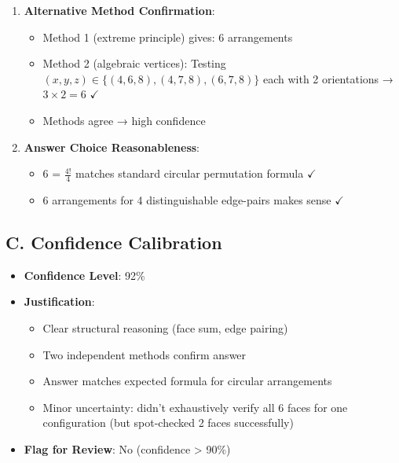 \documentclass[]{article}
\begin{document}
\begin{verificationbox}
\begin{enumerate}[leftmargin=*]
    \item \textbf{Alternative Method Confirmation}:
    \begin{itemize}
        \item Method 1 (extreme principle) gives: 6 arrangements
        \item Method 2 (algebraic vertices): Testing $(x,y,z) \in \{(4,6,8), (4,7,8), (6,7,8)\}$ each with 2 orientations → $3 \times 2 = 6$ $\checkmark$
        \item Methods agree → high confidence
    \end{itemize}
    
    \item \textbf{Answer Choice Reasonableness}:
    \begin{itemize}
        \item 6 = $\frac{4!}{4}$ matches standard circular permutation formula $\checkmark$
        \item 6 arrangements for 4 distinguishable edge-pairs makes sense $\checkmark$
    \end{itemize}
\end{enumerate}

\subsection*{C. Confidence Calibration}
\begin{itemize}[leftmargin=*]
    \item \textbf{Confidence Level}: 92\%
    \item \textbf{Justification}:
    \begin{itemize}
        \item Clear structural reasoning (face sum, edge pairing)
        \item Two independent methods confirm answer
        \item Answer matches expected formula for circular arrangements
        \item Minor uncertainty: didn't exhaustively verify all 6 faces for one configuration (but spot-checked 2 faces successfully)
    \end{itemize}
    \item \textbf{Flag for Review}: No (confidence > 90\%)
\end{itemize}
\end{verificationbox}
\end{document}
